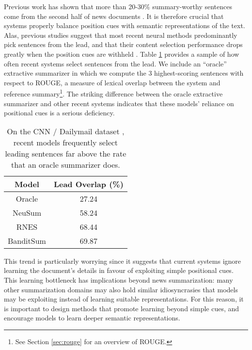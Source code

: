Previous work has shown that more than 20-30\% summary-worthy sentences come from the second half of news documents \parencite{abs3_NallapatiZSGX16, kedzie2018content}. It is therefore crucial that systems properly balance position cues with semantic representations of the text. Alas, previous studies suggest that most recent neural methods predominantly pick sentences from the lead, and that their content selection performance drops greatly when the position cues are withheld \parencite{kedzie2018content}. Table \ref{tab:lead_overlap} provides a sample of how often recent systems select sentences from the lead. We include an ``oracle'' extractive summarizer in which we compute the 3 highest-scoring sentences with respect to ROUGE, a measure of lexical overlap between the system and reference summary\footnote{See Section \ref{sec:rouge} for an overview of ROUGE.}. The striking difference between the oracle extractive summarizer and other recent systems indicates that these models' reliance on positional cues is a serious deficiency.

\begin{table}[t]
    \centering
    \begin{tabular}{|c|c|}
        \hline
        \textbf{Model} &  \textbf{Lead Overlap (\%)} \\ \hline
        Oracle & 27.24 \\ \hline
        NeuSum \parencite{neusum} & 58.24 \\ \hline
        RNES \parencite{DBLP:conf/aaai/WuH18} & 68.44 \\ \hline
        BanditSum \parencite{dong2018banditsum} & 69.87 \\ \hline
    \end{tabular}
    \caption[Frequency the lead is chosen among recent summarization models.]{On the CNN / Dailymail dataset \parencite{hermann2015teaching}, recent models frequently select leading sentences far above the rate that an oracle summarizer does.} %
    \label{tab:lead_overlap}
\end{table}

This trend is particularly worrying since it suggests that current systems ignore learning the document's details in favour of exploiting simple positional cues. This learning bottleneck has implications beyond news summarization: many other summarization domains may also hold similar idiosyncrasies that models may be exploiting instead of learning suitable representations. For this reason, it is important to design methods that promote learning beyond simple cues, and encourage models to learn deeper semantic representations.

